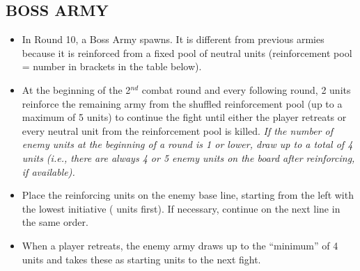 \begin{multicols*}{2}
\subsection*{\MakeUppercase{Boss Army}}

\begin{itemize}
  \item In Round 10, a Boss Army spawns. It is different from previous armies because it is reinforced from a fixed pool of neutral units (reinforcement pool = number in brackets in the table below).
  \item At the beginning of the 2$^{nd}$ combat round and every following round, 2 units reinforce the remaining army from the shuffled reinforcement pool (up to a maximum of 5 units) to continue the fight until either the player retreats or every neutral unit from the reinforcement pool is killed. \textit{If the number of enemy units at the beginning of a round is 1 or lower, draw up to a total of 4 units (i.e., there are always 4 or 5 enemy units on the board after reinforcing, if available).}
  \item Place the reinforcing units on the enemy base line, starting from the left with the lowest initiative ( units first). If necessary, continue on the next line in the same order.
  \item When a player retreats, the enemy army draws up to the ``minimum'' of 4 units and takes these as starting units to the next fight.
\end{itemize}

\end{multicols*}

